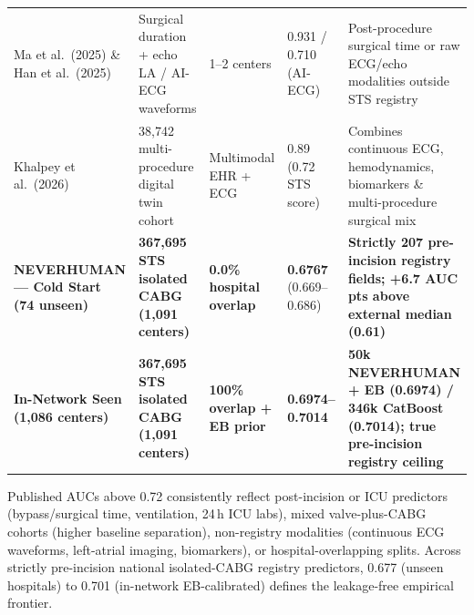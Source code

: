 \begin{table}[t]
\begin{tabularx}{\textwidth}{@{}L{2.75cm} L{2.65cm} L{2.15cm} L{1.85cm} Y@{}}
Ma et al.\ (2025) \cite{ma2025noaf} \& Han et al.\ (2025) \cite{han2025aiecg} & Surgical duration + echo LA / AI-ECG waveforms & 1--2 centers & 0.931 / 0.710 (AI-ECG) & Post-procedure surgical time or raw ECG/echo modalities outside STS registry \\
Khalpey et al.\ (2026) \cite{khalpey2026digital} & 38,742 multi-procedure digital twin cohort & Multimodal EHR + ECG & 0.89 (0.72 STS score) & Combines continuous ECG, hemodynamics, biomarkers \& multi-procedure surgical mix \\
\textbf{NEVERHUMAN — Cold Start (74 unseen)} & \textbf{367,695 STS isolated CABG (1,091 centers)} & \textbf{0.0\% hospital overlap} & \textbf{0.6767} (0.669--0.686) & \textbf{Strictly 207 pre-incision registry fields; +6.7 AUC pts above external median (0.61)} \\
\textbf{In-Network Seen (1,086 centers)} & \textbf{367,695 STS isolated CABG (1,091 centers)} & \textbf{100\% overlap + EB prior} & \textbf{0.6974--0.7014} & \textbf{50k NEVERHUMAN + EB (0.6974) / 346k CatBoost (0.7014); true pre-incision registry ceiling} \\
\bottomrule
\end{tabularx}
\vspace{2pt}
{\raggedright\sffamily\fontsize{6.8}{8.5}\selectfont\color{sub}Published AUCs above 0.72 consistently reflect post-incision or ICU predictors (bypass/surgical time, ventilation, 24\,h ICU labs), mixed valve-plus-CABG cohorts (higher baseline separation), non-registry modalities (continuous ECG waveforms, left-atrial imaging, biomarkers), or hospital-overlapping splits. Across strictly pre-incision national isolated-CABG registry predictors, 0.677 (unseen hospitals) to 0.701 (in-network EB-calibrated) defines the leakage-free empirical frontier.\par}
\end{table}
